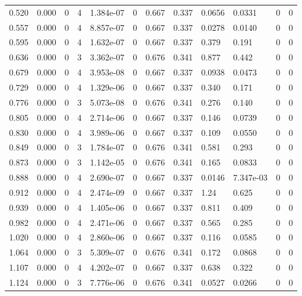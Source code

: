 \documentclass[preview]{standalone}
\begin{document}
{{\begin{tabular}{L{1.2cm}C{1.2cm} C{0.3cm}C{0.5cm} C{1.4cm}C{1.4cm} C{1.4cm}C{1.4cm} C{1.6cm}C{1.6cm} C{1.6cm}C{1.6cm}}
  0.520  &  0.000  & 0     &  4 &  1.384e-07  & 0  &  0.667&   0.337& 0.0656 & 0.0331   &  0 & 0  \\ 
  0.557  &  0.000  & 0     &  4 &  8.857e-07  & 0  &  0.667&   0.337& 0.0278 & 0.0140   &  0 & 0  \\ 
  0.595  &  0.000  & 0     &  4 &  1.632e-07  & 0  &  0.667&   0.337& 0.379 & 0.191   &  0 & 0  \\ 
  0.636  &  0.000  & 0     &  3 &  3.362e-07  & 0  &  0.676&   0.341& 0.877 & 0.442   &  0 & 0  \\ 
  0.679  &  0.000  & 0     &  4 &  3.953e-08  & 0  &  0.667&   0.337& 0.0938 & 0.0473   &  0 & 0  \\ 
  0.729  &  0.000  & 0     &  4 &  1.329e-06  & 0  &  0.667&   0.337& 0.340 & 0.171   &  0 & 0  \\ 
  0.776  &  0.000  & 0     &  3 &  5.073e-08  & 0  &  0.676&   0.341& 0.276 & 0.140   &  0 & 0  \\ 
  0.805  &  0.000  & 0     &  4 &  2.714e-06  & 0  &  0.667&   0.337& 0.146 & 0.0739   &  0 & 0  \\ 
  0.830  &  0.000  & 0     &  4 &  3.989e-06  & 0  &  0.667&   0.337& 0.109 & 0.0550   &  0 & 0  \\ 
  0.849  &  0.000  & 0     &  3 &  1.784e-07  & 0  &  0.676&   0.341& 0.581 & 0.293   &  0 & 0  \\ 
  0.873  &  0.000  & 0     &  3 &  1.142e-05  & 0  &  0.676&   0.341& 0.165 & 0.0833   &  0 & 0  \\ 
  0.888  &  0.000  & 0     &  4 &  2.690e-07  & 0  &  0.667&   0.337& 0.0146 & 7.347e-03   &  0 & 0  \\ 
  0.912  &  0.000  & 0     &  4 &  2.474e-09  & 0  &  0.667&   0.337& 1.24 & 0.625   &  0 & 0  \\ 
  0.939  &  0.000  & 0     &  4 &  1.405e-06  & 0  &  0.667&   0.337& 0.811 & 0.409   &  0 & 0  \\ 
  0.982  &  0.000  & 0     &  4 &  2.471e-06  & 0  &  0.667&   0.337& 0.565 & 0.285   &  0 & 0  \\ 
  1.020  &  0.000  & 0     &  4 &  2.860e-06  & 0  &  0.667&   0.337& 0.116 & 0.0585   &  0 & 0  \\ 
  1.064  &  0.000  & 0     &  3 &  5.309e-07  & 0  &  0.676&   0.341& 0.172 & 0.0868   &  0 & 0  \\ 
  1.107  &  0.000  & 0     &  4 &  4.202e-07  & 0  &  0.667&   0.337& 0.638 & 0.322   &  0 & 0  \\ 
  1.124  &  0.000  & 0     &  3 &  7.776e-06  & 0  &  0.676&   0.341& 0.0527 & 0.0266   &  0 & 0  \\ 

\end{tabular}}}
\end{document}
